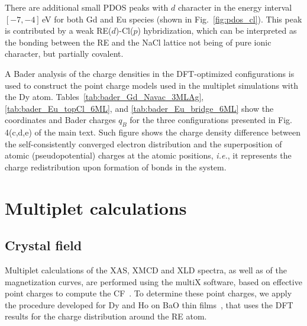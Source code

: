 {There are additional small PDOS peaks with $d$ character in the
energy interval $[-7,-4]$\,eV for both Gd and Eu species (shown in Fig.~\ref{fig:pdos_cl}).
This peak is contributed by a weak RE($d$)-Cl($p$) hybridization,
which can be interpreted as the bonding between the RE and the NaCl lattice
not being of pure ionic character, but partially covalent.

A Bader analysis of the charge densities in the DFT-optimized configurations is used to construct the point charge models used in the multiplet simulations with the Dy atom. Tables~\ref{tab:bader_Gd_Navac_3MLAg}, \ref{tab:bader_Eu_topCl_6ML}, and \ref{tab:bader_Eu_bridge_6ML} show the coordinates and Bader charges $q_B$ for the three configurations presented in Fig.\,4(c,d,e) of the main text. Such figure shows the charge density difference between the self-consistently converged electron distribution and the superposition of atomic (pseudopotential) charges at the atomic positions, \textit{i.e.}, it represents the charge redistribution upon formation of bonds in the system.










\section{Multiplet calculations}



\subsection{Crystal field}

Multiplet calculations of the XAS, XMCD and XLD spectra, as well as of the magnetization curves, are performed using the multiX software, based on effective point charges to compute the CF~\cite{uld12}. To determine these point charges, we apply the procedure developed for Dy and Ho on BaO thin films~\cite{sor23}, that uses the DFT results for the charge distribution around the RE atom.

}
